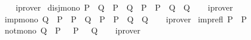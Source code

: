 \begin{isabellebody}
%
\isadelimproof
\ \ %
\endisadelimproof
%
\isatagproof
{}\isamarkupfalse%
\ iprover%
\endisatagproof
{\isafoldproof}%
%
\isadelimproof
\isanewline
%
\endisadelimproof
\isanewline
{}\isamarkupfalse%
\ disj{\isacharunderscore}{\kern0pt}mono{\isacharcolon}{\kern0pt}\ {\isachardoublequoteopen}P{}\ {\isasymlongrightarrow}\ Q{}\ {\isasymLongrightarrow}\ P{}\ {\isasymlongrightarrow}\ Q{}\ {\isasymLongrightarrow}\ {\isacharparenleft}{\kern0pt}P{}\ {\isasymor}\ P{}{\isacharparenright}{\kern0pt}\ {\isasymlongrightarrow}\ {\isacharparenleft}{\kern0pt}Q{}\ {\isasymor}\ Q{}{\isacharparenright}{\kern0pt}{\isachardoublequoteclose}\isanewline
%
\isadelimproof
\ \ %
\endisadelimproof
%
\isatagproof
{}\isamarkupfalse%
\ iprover%
\endisatagproof
{\isafoldproof}%
%
\isadelimproof
\isanewline
%
\endisadelimproof
\isanewline
{}\isamarkupfalse%
\ imp{\isacharunderscore}{\kern0pt}mono{\isacharcolon}{\kern0pt}\ {\isachardoublequoteopen}Q{}\ {\isasymlongrightarrow}\ P{}\ {\isasymLongrightarrow}\ P{}\ {\isasymlongrightarrow}\ Q{}\ {\isasymLongrightarrow}\ {\isacharparenleft}{\kern0pt}P{}\ {\isasymlongrightarrow}\ P{}{\isacharparenright}{\kern0pt}\ {\isasymlongrightarrow}\ {\isacharparenleft}{\kern0pt}Q{}\ {\isasymlongrightarrow}\ Q{}{\isacharparenright}{\kern0pt}{\isachardoublequoteclose}\isanewline
%
\isadelimproof
\ \ %
\endisadelimproof
%
\isatagproof
{}\isamarkupfalse%
\ iprover%
\endisatagproof
{\isafoldproof}%
%
\isadelimproof
\isanewline
%
\endisadelimproof
\isanewline
{}\isamarkupfalse%
\ imp{\isacharunderscore}{\kern0pt}refl{\isacharcolon}{\kern0pt}\ {\isachardoublequoteopen}P\ {\isasymlongrightarrow}\ P{\isachardoublequoteclose}%
\isadelimproof
\ %
\endisadelimproof
%
\isatagproof
\isacommand{{\isachardot}{\kern0pt}{\isachardot}{\kern0pt}}\isamarkupfalse%
%
\endisatagproof
{\isafoldproof}%
%
\isadelimproof
%
\endisadelimproof
\isanewline
\isanewline
{}\isamarkupfalse%
\ not{\isacharunderscore}{\kern0pt}mono{\isacharcolon}{\kern0pt}\ {\isachardoublequoteopen}Q\ {\isasymlongrightarrow}\ P\ {\isasymLongrightarrow}\ {\isasymnot}\ P\ {\isasymlongrightarrow}\ {\isasymnot}\ Q{\isachardoublequoteclose}\isanewline
%
\isadelimproof
\ \ %
\endisadelimproof
%
\isatagproof
{}\isamarkupfalse%
\ iprover%
\endisatagproof
{\isafoldproof}%
%
\isadelimproof
\isanewline
%
\endisadelimproof

\end{isabellebody}
